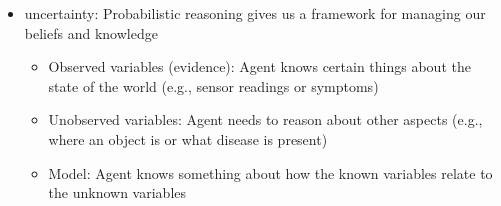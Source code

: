 \documentclass[10pt]{article}
\begin{document}
\begin{itemize}[label=\(\star\), leftmargin=1em, itemsep=-0.3em]
    \item uncertainty: Probabilistic reasoning gives us a framework for managing our beliefs and knowledge
          \begin{itemize}[label=\(\star\), leftmargin=1em, itemsep=-0.3em]
              \item Observed variables (evidence): Agent knows certain things
                    about the state of the world (e.g., sensor readings or symptoms)
              \item Unobserved variables: Agent needs to reason about other aspects (e.g., where an object is or what disease is present)
              \item Model: Agent knows something about how the known variables relate to the unknown variables
          \end{itemize}


\end{itemize}
\end{document}
